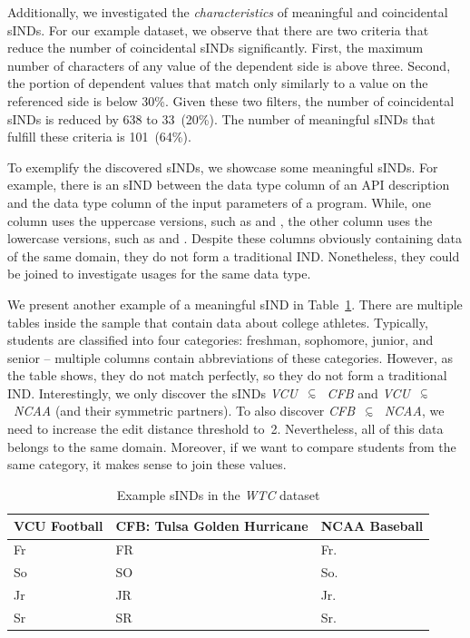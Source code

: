 Additionally, we investigated the \emph{characteristics} of meaningful and coincidental sINDs.
For our example dataset, we observe that there are two criteria that reduce the number of coincidental sINDs significantly.
First, the maximum number of characters of any value of the dependent side is above three.
Second, the portion of dependent values that match only similarly to a value on the referenced side is below 30\%.
Given these two filters, the number of coincidental sINDs is reduced by 638 to 33~(20\%). 
The number of meaningful sINDs that fulfill these criteria is 101~(64\%).

To exemplify the discovered sINDs, we showcase some meaningful sINDs.
For example, there is an sIND between the data type column of an API description and the data type column of the input parameters of a program.
While, one column uses the uppercase versions, such as  and , the other column uses the lowercase versions, such as  and .
Despite these columns obviously containing data of the same domain, they do not form a traditional IND.
Nonetheless, they could be joined to investigate usages for the same data type.

We present another example of a meaningful sIND in Table~\ref{table:eval:best_matches}.
There are multiple tables inside the sample that contain data about college athletes.
Typically, students are classified into four categories: freshman, sophomore, junior, and senior -- multiple columns contain abbreviations of these categories.
However, as the table shows, they do not match perfectly, so they do not form a traditional IND.
Interestingly, we only discover the sINDs \mbox{\emph{VCU} $\simIND{}$ \emph{CFB}} and \mbox{\emph{VCU} $\simIND{}$ \emph{NCAA}} (and their symmetric partners).
To also discover \mbox{\emph{CFB} $\simIND{}$ \emph{NCAA}}, we need to increase the edit distance threshold to~2.
Nevertheless, all of this data belongs to the same domain.
Moreover, if we want to compare students from the same category, it makes sense to join these values.
\begin{table}[h]
\centering \small
\caption{Example sINDs in the \emph{WTC} dataset}
\label{table:eval:best_matches}
\begin{tabular}{@{}lll@{}}
\toprule
VCU Football	& CFB: Tulsa Golden Hurricane	& NCAA Baseball \\
\midrule
Fr 				& FR       						& Fr.     		\\
So      		& SO                            & So.     		\\
Jr    			& JR          					& Jr.     		\\
Sr    			& SR          					& Sr.    		\\
\bottomrule
\end{tabular}
\end{table}
